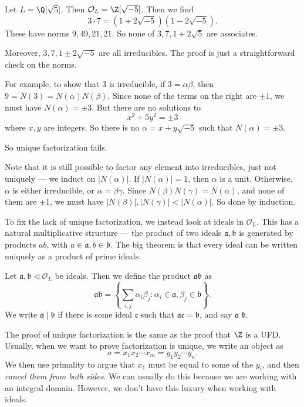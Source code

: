 \documentclass[a4paper]{article}
\begin{document}
\begin{eg}
  Let $L = \Q[\sqrt{5}]$. Then $\mathcal{O}_L = \Z[\sqrt{-5}]$. Then we find
  \[
    3 \cdot 7 = (1 + 2\sqrt{-5})(1 - 2\sqrt{-5}).
  \]
  These have norms $9, 49, 21, 21$. So none of $3, 7, 1 + 2\sqrt{5}$ are associates.

  Moreover, $3, 7, 1 \pm 2\sqrt{-5}$ are all irreducibles. The proof is just a straightforward check on the norms.

  For example, to show that $3$ is irreducible, if $3 = \alpha \beta$, then $9 = N(3) = N(\alpha) N(\beta)$. Since none of the terms on the right are $\pm 1$, we must have $N(\alpha) = \pm 3$. But there are no solutions to
  \[
    x^2 + 5y^2 = \pm 3
  \]
  where $x, y$ are integers. So there is no $\alpha = x + y\sqrt{-5}$ such that $N(\alpha) = \pm 3$.

  So unique factorization fails.
\end{eg}

Note that it is still possible to factor any element into irreducibles, just not uniquely --- we induct on $|N(\alpha)|$. If $|N(\alpha)| = 1$, then $\alpha$ is a unit. Otherwise, $\alpha$ is either irreducible, or $\alpha = \beta \gamma$. Since $N(\beta)N(\gamma) = N(\alpha)$, and none of them are $\pm 1$, we must have $|N(\beta)|, |N(\gamma)| < |N(\alpha)|$. So done by induction.

To fix the lack of unique factorization, we instead look at ideals in $\mathcal{O}_L$. This has a natural multiplicative structure --- the product of two ideals $\mathfrak{a}, \mathfrak{b}$ is generated by products $ab$, with $a \in \mathfrak{a}, b \in \mathfrak{b}$. The big theorem is that every ideal can be written uniquely as a product of prime ideals.
\begin{defi}
  Let $\mathfrak{a}, \mathfrak{b}\lhd \mathcal{O}_L$ be ideals. Then we define the product $\mathfrak{a}\mathfrak{b}$ as
  \[
    \mathfrak{a} \mathfrak{b} = \left\{\sum_{i, j} \alpha_i \beta_j: \alpha_i \in \mathfrak{a}, \beta_j \in \mathfrak{b}\right\}.
  \]
  We write $\mathfrak{a} \mid \mathfrak{b}$ if there is some ideal $\mathfrak{c}$ such that $\mathfrak{a}\mathfrak{c} = \mathfrak{b}$, and say $\mathfrak{a}$  $\mathfrak{b}$.
\end{defi}
The proof of unique factorization is the same as the proof that $\Z$ is a UFD. Usually, when we want to prove factorization is unique, we write an object as
\[
  a = x_1 x_2 \cdots x_m = y_1 y_2 \cdots y_n.
\]
We then use primality to argue that $x_1$ must be equal to some of the $y_i$, and then \emph{cancel them from both sides}. We can usually do this because we are working with an integral domain. However, we don't have this luxury when working with ideals.
\end{document}
